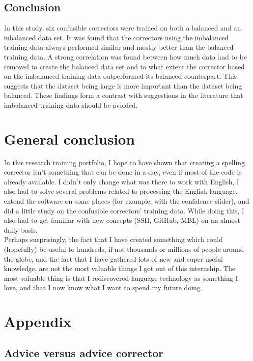 \documentclass[12pt]{article}
\let\stdsection\section
\renewcommand\section{\newpage\stdsection}
\begin{document}
\subsection{Conclusion}
In this study, six confusible correctors were trained on both a balanced and an inbalanced data set. It was found that the correctors using the imbalanced training data always performed similar and mostly better than the balanced training data. A strong correlation was found between how much data had to be removed to create the balanced data set and to what extent the corrector based on the imbalanced training data outperformed its balanced counterpart. This suggests that the dataset being large is more important than the dataset being balanced. These findings form a contrast with suggestions in the literature that imbalanced training data should be avoided.

\section{General conclusion}
In this research training portfolio, I hope to have shown that creating a spelling corrector isn't something that can be done in a day, even if most of the code is already available. I didn't only change what was there to work with English, I also had to solve several problems related to processing the English language, extend the software on some places (for example, with the confidence slider), and did a little study on the confusible correctors' training data. While doing this, I also had to get familiar with new concepts (SSH, GitHub, MBL) on an almost daily basis.\\\indent
Perhaps surprisingly, the fact that I have created something which could (hopefully) be useful to hundreds, if not thousands or millions of people around the globe, and the fact that I have gathered lots of new and super useful knowledge, are not the most valuable things I got out of this internship. The most valuable thing is that I rediscovered language technology as something I love, and that I now know what I want to spend my future doing.

\section{Appendix}

\subsection{Advice versus advice corrector}
\end{document}
